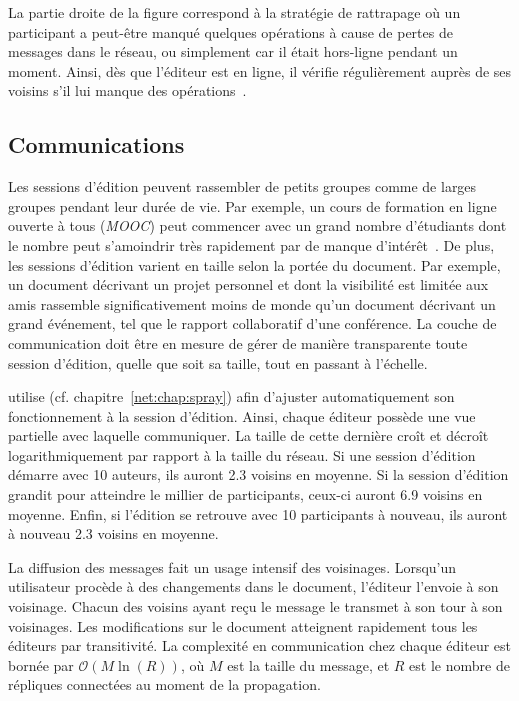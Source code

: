 \noindent La partie droite de la figure correspond à la stratégie de rattrapage
où un participant a peut-être manqué quelques opérations à cause de pertes de
messages dans le réseau, ou simplement car il était hors-ligne pendant un
moment. Ainsi, dès que l'éditeur est en ligne, il vérifie régulièrement auprès
de ses voisins s'il lui manque des opérations~\cite{demers1987epidemic,
  vanderlinde2016delta}.


\subsection{Communications}

Les sessions d'édition peuvent rassembler de petits groupes comme de larges
groupes pendant leur durée de vie. Par exemple, un cours de formation en ligne
ouverte à tous (\emph{MOOC}) peut commencer avec un grand nombre d'étudiants
dont le nombre peut s'amoindrir très rapidement par de manque
d'intérêt~\cite{breslow2013studying}. De plus, les sessions d'édition varient en
taille selon la portée du document. Par exemple, un document décrivant un projet
personnel et dont la visibilité est limitée aux amis rassemble significativement
moins de monde qu'un document décrivant un grand événement, tel que le rapport
collaboratif d'une conférence. La couche de communication doit être en mesure de
gérer de manière transparente toute session d'édition, quelle que soit sa
taille, tout en passant à l'échelle.

\CRATE utilise \SPRAY (cf. chapitre~\ref{net:chap:spray}) afin d'ajuster
automatiquement son fonctionnement à la session d'édition. Ainsi, chaque éditeur
possède une vue partielle avec laquelle communiquer. La taille de cette dernière
croît et décroît logarithmiquement par rapport à la taille du réseau. Si une
session d'édition démarre avec 10 auteurs, ils auront 2.3 voisins en moyenne. Si
la session d'édition grandit pour atteindre le millier de participants, ceux-ci
auront 6.9 voisins en moyenne. Enfin, si l'édition se retrouve avec 10
participants à nouveau, ils auront à nouveau 2.3 voisins en moyenne.

La diffusion des messages fait un usage intensif des voisinages. Lorsqu'un
utilisateur procède à des changements dans le document, l'éditeur l'envoie à son
voisinage. Chacun des voisins ayant reçu le message le transmet à son tour à
son voisinages. Les modifications sur le document atteignent rapidement tous les
éditeurs par transitivité. La complexité en communication chez chaque éditeur
est bornée par $\mathcal{O}(M\ln(R))$, où $M$ est la taille du message, et
$R$ est le nombre de répliques connectées au moment de la propagation.

